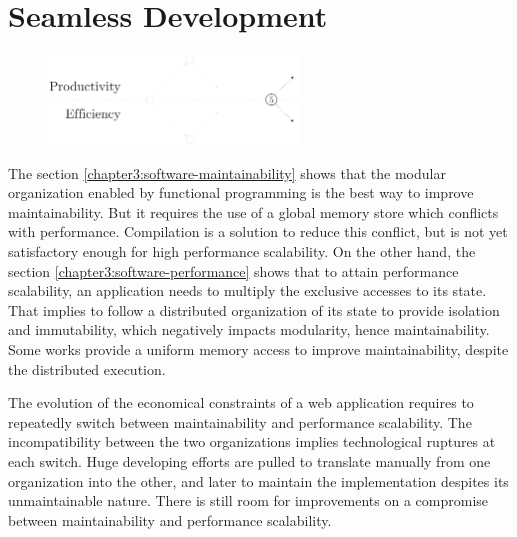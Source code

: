 \section{Seamless Development} \label{chapter3:objectives}

\begin{figure}[h!] \label{fig:state-of-the-art-proposition}
\begin{center}
\includegraphics[width=0.6\textwidth]{../ressources/state-of-the-art-5.pdf}
\end{center}
\end{figure}



The section \ref{chapter3:software-maintainability} shows that the modular organization enabled by functional programming is the best way to improve maintainability.
But it requires the use of a global memory store which conflicts with performance.
Compilation is a solution to reduce this conflict, but is not yet satisfactory enough for high performance scalability.
On the other hand, the section \ref{chapter3:software-performance} shows that to attain performance scalability, an application needs to multiply the exclusive accesses to its state.
That implies to follow a distributed organization of its state to provide isolation and immutability, which negatively impacts modularity, hence maintainability.
Some works provide a uniform memory access to improve maintainability, despite the distributed execution.

The evolution of the economical constraints of a web application requires to repeatedly switch between maintainability and performance scalability.
The incompatibility between the two organizations implies technological ruptures at each switch.
Huge developing efforts are pulled to translate manually from one organization into the other, and later to maintain the implementation despites its unmaintainable nature.
There is still room for improvements on a compromise between maintainability and performance scalability.

